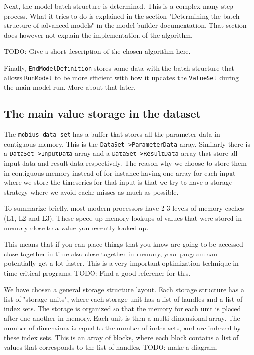 \documentclass[11pt]{article}
\theoremstyle{definition}
\begin{document}
Next, the model batch structure is determined. This is a complex many-step process. What it tries to do is explained in the section "Determining the batch structure of advanced models" in the model builder documentation. That section does however not explain the implementation of the algorithm.

TODO: Give a short description of the chosen algorithm here.

Finally, {\tt EndModelDefinition} stores some data with the batch structure that allows {\tt RunModel} to be more efficient with how it updates the {\tt ValueSet} during the main model run. More about that later.

\subsection{The main value storage in the dataset}

The {\tt mobius\_data\_set} has a buffer that stores all the parameter data in contiguous memory. This is the {\tt DataSet->ParameterData} array. Similarly there is a {\tt DataSet->InputData} array and a {\tt DataSet->ResultData} array that store all input data and result data respectively. The reason why we choose to store them in contiguous memory instead of for instance having one array for each input where we store the timeseries for that input is that we try to have a storage strategy where we avoid cache misses as much as possible.

To summarize briefly, most modern processors have 2-3 levels of memory caches (L1, L2 and L3). These speed up memory lookups of values that were stored in memory close to a value you recently looked up.

This means that if you can place things that you know are going to be accessed close together in time also close together in memory, your program can potentially get a lot faster. This is a very important optimization technique in time-critical programs. TODO: Find a good reference for this.

We have chosen a general storage structure layout. Each storage structure has a list of "storage units", where each storage unit has a list of handles and a list of index sets. The storage is organized so that the memory for each unit is placed after one another in memory. Each unit is then a multi-dimensional array. The number of dimensions is equal to the number of index sets, and are indexed by these index sets. This is an array of blocks, where each block contains a list of values that corresponds to the list of handles. TODO: make a diagram.
\end{document}
